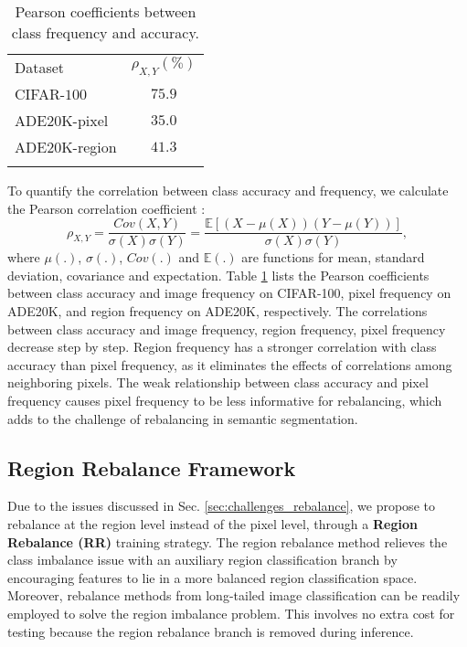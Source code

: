 \documentclass[final]{cvpr}
\begin{document}
\begin{table}[t]
	\centering
	\setlength{\tabcolsep}{26pt}
	\caption{Pearson coefficients between class frequency and accuracy.}
	\label{tab:pearson_coefficient}
	{
		\begin{tabular}{l|c}
			\shline
			Dataset &$\rho_{X,Y} (\%)$ \\
			\shline
			CIFAR-$100$       & $75.9$ \\
			ADE$20$K-pixel    & $35.0$ \\
			ADE$20$K-region   & $41.3$ \\
			\shline
		\end{tabular}
	}
	\vspace{-0.1in}
\end{table}

To quantify the correlation between class accuracy and frequency, we calculate the Pearson correlation coefficient \cite{benesty2009pearson}:
\begin{equation}
\rho_{X,Y} = \frac{Cov(X,Y)}{\sigma(X) \sigma(Y)} = \frac{\mathbb{E}[(X-\mu(X))(Y-\mu(Y))]}{\sigma(X) \sigma(Y)},
\end{equation}
where $\mu(.)$, $\sigma(.)$, $Cov(.)$ and $\mathbb{E}(.)$ are functions for mean, standard deviation, covariance and expectation.
Table \ref{tab:pearson_coefficient} lists the Pearson coefficients between class accuracy and image frequency on CIFAR-100, pixel frequency on ADE20K, and region frequency on ADE20K, respectively. The correlations between class accuracy and image frequency, region frequency, pixel frequency decrease step by step. Region frequency has a stronger correlation with class accuracy than pixel frequency, as it eliminates the effects of correlations among neighboring pixels. 
The weak relationship between class accuracy and pixel frequency causes pixel frequency to be less informative for rebalancing, which adds to the challenge of rebalancing in semantic segmentation.


\vspace{-0.1in}
\subsection{Region Rebalance Framework}
Due to the issues discussed in Sec. \ref{sec:challenges_rebalance},
we propose to rebalance at the region level instead of the pixel level, through a \textbf{Region Rebalance (RR)} training strategy. The region rebalance method relieves the class imbalance issue with an auxiliary region classification branch by encouraging features to lie in a more balanced region classification space. Moreover, rebalance methods from long-tailed image classification can be readily employed to solve the region imbalance problem. This involves no extra cost for testing because the region rebalance branch is removed during inference.
\end{document}
